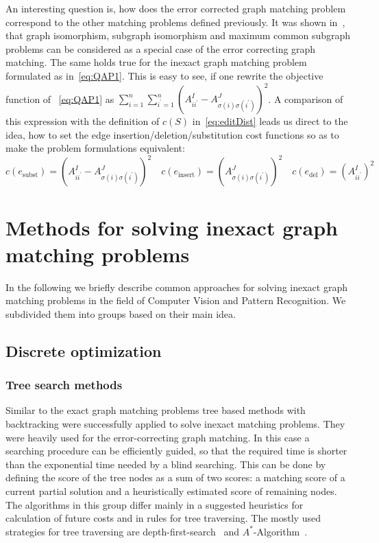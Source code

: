 An interesting question is, how does the error corrected graph matching problem correspond to the other matching problems defined previously. It was shown in~\cite{Bunke1999_UnderlyingCosts}, that graph isomorphism, subgraph isomorphism and maximum common subgraph problems can be considered as a special case of the error correcting graph matching. The same holds true for the inexact graph matching problem formulated as in~\eqref{eq:QAP1}. This is easy to see, if one rewrite the objective function of ~\eqref{eq:QAP1} as $\sum_{i=1}^n\sum_{i^\prime=1}^{n}(A^I_{ii^\prime}-A^J_{\sigma(i)\sigma(i^\prime)})^2$. A comparison of this expression with the definition of $c(S)$ in~\eqref{eq:editDist} leads us direct to the idea, how to set the edge insertion/deletion/substitution cost functions so as to make the problem formulations equivalent: 
\begin{equation*}
c(e_{\text{subst}})=(A^I_{ii^\prime}-A^J_{\sigma(i)\sigma(i^\prime)})^2\quad c(e_{\text{insert}})=(A^J_{\sigma(i)\sigma(i^\prime)})^2\quad c(e_{\text{del}})=(A^I_{ii^\prime})^2
\end{equation*}
\section{Methods for solving inexact graph matching problems}
In the following we briefly describe common approaches for solving inexact graph matching problems in the field of Computer Vision and Pattern Recognition. We subdivided them into groups based on their main idea.
\subsection{Discrete optimization}
\subsubsection{Tree search methods}
Similar to the exact graph matching problems tree based methods with backtracking were successfully applied to solve inexact matching problems. They were heavily used for the error-correcting graph matching. In this case a searching procedure can be efficiently guided, so that the required time is shorter than the exponential time needed by a blind searching. This can be done by defining the score of the tree nodes as a sum of two scores: a matching score of a current partial solution and a heuristically estimated score of remaining nodes. The algorithms in this group differ mainly in a suggested heuristics for calculation of future costs and in rules for tree traversing. The mostly used strategies for tree traversing are depth-first-search~\cite{Cormen} and $A^*$-Algorithm~\cite{AStar}.

